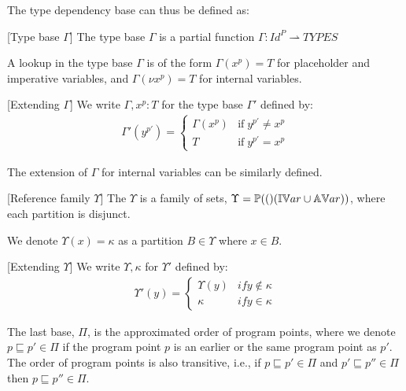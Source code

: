 \documentclass[../../master.tex]{subfiles}
\begin{document}
The type dependency base can thus be defined as:
\begin{definition}{[Type base $\Gamma$]}
	The type base $\Gamma$ is a partial function $\Gamma:Id^P\rightharpoonup TYPES$
\end{definition}

A lookup in the type base $\Gamma$ is of the form $\Gamma(x^p)=T$ for placeholder and imperative variables, and $\Gamma(\nu x^p)=T$ for internal variables.

\begin{definition}{[Extending $\Gamma$]}
	We write $\Gamma,x^p:T$ for the type base $\Gamma'$ defined by:
	\begin{align*}
		\Gamma'(y^{p'})=
		\left\{\begin{matrix}
			\Gamma(x^p) & \mbox{if}\;y^{p'} \neq x^{p}\\ 
			T & \mbox{if}\;y^{p'} = x^{p}
		\end{matrix}\right.
	\end{align*}
\end{definition}
The extension of $\Gamma$ for internal variables can be similarly defined.
\bigskip

\begin{definition}{[Reference family $\Upsilon$]}
	The  $\Upsilon$ is a family of sets, $\Upsilon=\mathbb{P}(()(\mathbb{IV}ar\cup\mathbb{AV}ar))$, where each partition is disjunct.
\end{definition}
We denote $\Upsilon(x)=\kappa$ as a partition $B\in\Upsilon$ where $x\in B$.

\begin{definition}{[Extending $\Upsilon$]}
	We write $\Upsilon,\kappa$ for $\Upsilon'$ defined by:
	\begin{align*}
		\Upsilon'(y)=
		\left\{\begin{matrix}
 			\Upsilon(y) & if y\not\in\kappa \\ 
 			\kappa & if y\in\kappa 
		\end{matrix}\right.
	\end{align*}
\end{definition}
\bigskip

The last base, $\Pi$, is the approximated order of program points, where we denote $p\sqsubseteq p'\in\Pi$ if the program point $p$ is an earlier or the same program point as $p'$.
The order of program points is also transitive, i.e., if $p\sqsubseteq p'\in\Pi$ and $p'\sqsubseteq p''\in\Pi$ then $p\sqsubseteq p''\in\Pi$.
\end{document}
